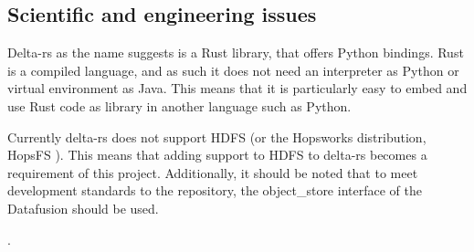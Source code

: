 \subsection{Scientific and engineering issues}
Delta-rs \cite{DeltaioDeltars2024} as the name suggests is a Rust \cite{RustProgrammingLanguage} library, that offers Python bindings. Rust is a compiled language, and as such it does not need an interpreter as Python or virtual environment as Java. This means that it is particularly easy to embed and use Rust code as library in another language such as Python. 

Currently delta-rs does not support \gls{HDFS} (or the Hopsworks distribution, HopsFS \cite{niaziHopsFSScalingHierarchical2017}). This means that adding support to \gls{HDFS} to delta-rs becomes a requirement of this project. Additionally, it should be noted that to meet development standards to the repository, the object\_store \cite{Object_storeRust} interface of the Datafusion \cite{ApacheDataFusionApache} should be used.

.